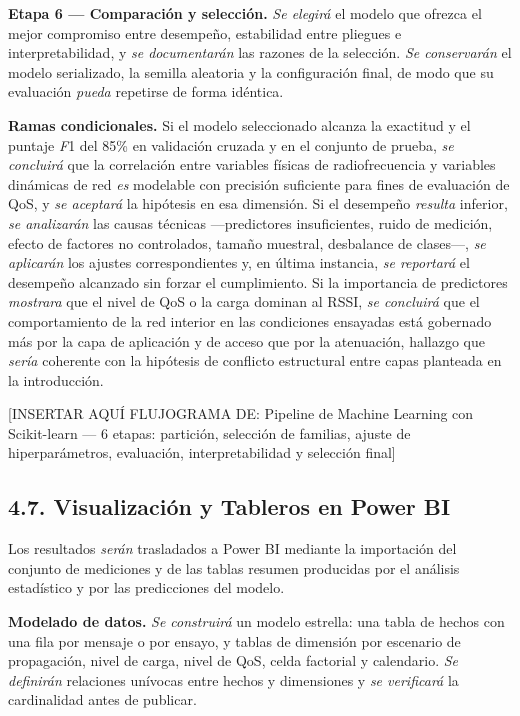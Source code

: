 \documentclass[
  12pt,
]{article}
\begin{document}
\textbf{Etapa 6 — Comparación y selección.} \emph{Se elegirá} el modelo
que ofrezca el mejor compromiso entre desempeño, estabilidad entre
pliegues e interpretabilidad, y \emph{se documentarán} las razones de la
selección. \emph{Se conservarán} el modelo serializado, la semilla
aleatoria y la configuración final, de modo que su evaluación
\emph{pueda} repetirse de forma idéntica.

\textbf{Ramas condicionales.} Si el modelo seleccionado alcanza la
exactitud y el puntaje \emph{F}1 del 85\% en validación cruzada y en el
conjunto de prueba, \emph{se concluirá} que la correlación entre
variables físicas de radiofrecuencia y variables dinámicas de red
\emph{es} modelable con precisión suficiente para fines de evaluación de
QoS, y \emph{se aceptará} la hipótesis en esa dimensión. Si el desempeño
\emph{resulta} inferior, \emph{se analizarán} las causas técnicas
—predictores insuficientes, ruido de medición, efecto de factores no
controlados, tamaño muestral, desbalance de clases—, \emph{se aplicarán}
los ajustes correspondientes y, en última instancia, \emph{se reportará}
el desempeño alcanzado sin forzar el cumplimiento. Si la importancia de
predictores \emph{mostrara} que el nivel de QoS o la carga dominan al
RSSI, \emph{se concluirá} que el comportamiento de la red interior en
las condiciones ensayadas está gobernado más por la capa de aplicación y
de acceso que por la atenuación, hallazgo que \emph{sería} coherente con
la hipótesis de conflicto estructural entre capas planteada en la
introducción.

{[}INSERTAR AQUÍ FLUJOGRAMA DE: Pipeline de Machine Learning con
Scikit-learn — 6 etapas: partición, selección de familias, ajuste de
hiperparámetros, evaluación, interpretabilidad y selección final{]}

\subsection{4.7. Visualización y Tableros en Power
BI}\label{visualizaciuxf3n-y-tableros-en-power-bi}

Los resultados \emph{serán} trasladados a Power BI mediante la
importación del conjunto de mediciones y de las tablas resumen
producidas por el análisis estadístico y por las predicciones del
modelo.

\textbf{Modelado de datos.} \emph{Se construirá} un modelo estrella: una
tabla de hechos con una fila por mensaje o por ensayo, y tablas de
dimensión por escenario de propagación, nivel de carga, nivel de QoS,
celda factorial y calendario. \emph{Se definirán} relaciones unívocas
entre hechos y dimensiones y \emph{se verificará} la cardinalidad antes
de publicar.
\end{document}
